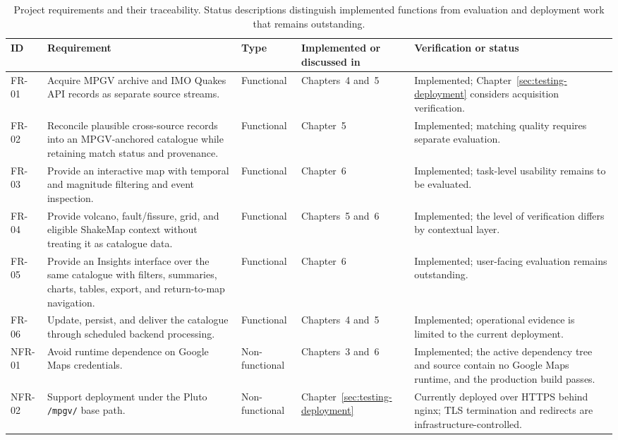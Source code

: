 \documentclass[12pt]{article}
\begin{document}
\begin{table}[H]
\centering
\caption{Project requirements and their traceability. Status descriptions distinguish implemented functions from evaluation and deployment work that remains outstanding.}
\label{tab:project-requirements}
\footnotesize
\setlength{\tabcolsep}{2pt}
\renewcommand{\arraystretch}{1.08}
\begin{tabular}{
    >{\raggedright\arraybackslash}p{0.9cm}
    >{\raggedright\arraybackslash}p{4.9cm}
    >{\raggedright\arraybackslash}p{2.0cm}
    >{\raggedright\arraybackslash}p{2.9cm}
    >{\raggedright\arraybackslash}p{3.9cm}}
\toprule
\textbf{ID} & \textbf{Requirement} & \textbf{Type} & \textbf{Implemented or discussed in} & \textbf{Verification or status} \\
\midrule
FR-01 & Acquire MPGV archive and IMO Quakes API records as separate source streams. & Functional & Chapters~4 and~5 & Implemented; Chapter~\ref{sec:testing-deployment} considers acquisition verification. \\
FR-02 & Reconcile plausible cross-source records into an MPGV-anchored catalogue while retaining match status and provenance. & Functional & Chapter~5 & Implemented; matching quality requires separate evaluation. \\
FR-03 & Provide an interactive map with temporal and magnitude filtering and event inspection. & Functional & Chapter~6 & Implemented; task-level usability remains to be evaluated. \\
FR-04 & Provide volcano, fault/fissure, grid, and eligible ShakeMap context without treating it as catalogue data. & Functional & Chapters~5 and~6 & Implemented; the level of verification differs by contextual layer. \\
FR-05 & Provide an Insights interface over the same catalogue with filters, summaries, charts, tables, export, and return-to-map navigation. & Functional & Chapter~6 & Implemented; user-facing evaluation remains outstanding. \\
FR-06 & Update, persist, and deliver the catalogue through scheduled backend processing. & Functional & Chapters~4 and~5 & Implemented; operational evidence is limited to the current deployment. \\
\midrule
NFR-01 & Avoid runtime dependence on Google Maps credentials. & Non-functional & Chapters~3 and~6 & Implemented; the active dependency tree and source contain no Google Maps runtime, and the production build passes. \\
NFR-02 & Support deployment under the Pluto \texttt{/mpgv/} base path. & Non-functional & Chapter~\ref{sec:testing-deployment} & Currently deployed over HTTPS behind nginx; TLS termination and redirects are infrastructure-controlled. \\

\end{tabular}
\end{table}
\end{document}

